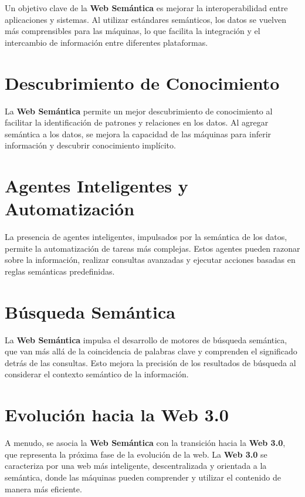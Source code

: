 \documentclass[11pt]{report}
\begin{document}
	Un objetivo clave de la \textbf{Web Semántica} es mejorar la interoperabilidad entre aplicaciones y sistemas. Al utilizar estándares semánticos, los datos se vuelven más comprensibles para las máquinas, lo que facilita la integración y el intercambio de información entre diferentes plataformas.

	\section{Descubrimiento de Conocimiento}

	La \textbf{Web Semántica} permite un mejor descubrimiento de conocimiento al facilitar la identificación de patrones y relaciones en los datos. Al agregar semántica a los datos, se mejora la capacidad de las máquinas para inferir información y descubrir conocimiento implícito.

	\section{Agentes Inteligentes y Automatización}

	La presencia de agentes inteligentes, impulsados por la semántica de los datos, permite la automatización de tareas más complejas. Estos agentes pueden razonar sobre la información, realizar consultas avanzadas y ejecutar acciones basadas en reglas semánticas predefinidas.

	\section{Búsqueda Semántica}

	La \textbf{Web Semántica} impulsa el desarrollo de motores de búsqueda semántica, que van más allá de la coincidencia de palabras clave y comprenden el significado detrás de las consultas. Esto mejora la precisión de los resultados de búsqueda al considerar el contexto semántico de la información.

	\section{Evolución hacia la Web 3.0}

	A menudo, se asocia la \textbf{Web Semántica} con la transición hacia la \textbf{Web 3.0}, que representa la próxima fase de la evolución de la web. La \textbf{Web 3.0} se caracteriza por una web más inteligente, descentralizada y orientada a la semántica, donde las máquinas pueden comprender y utilizar el contenido de manera más eficiente.
\end{document}
